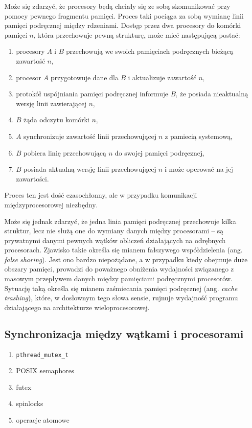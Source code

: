 \documentclass[12pt,a4paper,titlepage,twoside]{mwart}
\begin{document}
Może się zdarzyć, że procesory będą chciały się ze sobą skomunikować przy
pomocy pewnego fragmentu pamięci. Proces taki pociąga za sobą wymianę linii
pamięci podręcznej między rdzeniami. Dostęp przez dwa procesory do komórki
pamięci $n$, która przechowuje pewną strukturę, może mieć następującą postać:

\begin{enumerate}
\item procesory $A$ i $B$ przechowują we swoich pamięciach podręcznych
bieżącą zawartość $n$,
\item procesor $A$ przygotowuje dane dla $B$ i aktualizuje zawartość $n$,
\item protokół uspójniania pamięci podręcznej informuje $B$, że posiada
nieaktualną wersję linii zawierającej $n$,
\item $B$ żąda odczytu komórki $n$,
\item $A$ synchronizuje zawartość linii przechowującej $n$ z pamiecią
systemową,
\item $B$ pobiera linię przechowującą $n$ do swojej pamięci podręcznej,
\item $B$ posiada aktualną wersję linii przechowującej $n$ i może operować na
jej zawartości.
\end{enumerate}

Proces ten jest dość czasochłonny, ale w przypadku komunikacji
międzyprocesorowej niezbędny.

Może się jednak zdarzyć, że jedna linia pamięci podręcznej przechowuje kilka
struktur, lecz nie służą one do wymiany danych między procesorami -- są
prywatnymi danymi pewnych wątków obliczeń działających na odrębnych procesorach.
Zjawisko takie określa się mianem fałszywego współdzielenia (ang. \textit{false
sharing}). Jest ono bardzo niepożądane, a w przypadku kiedy obejmuje duże
obszary pamięci, prowadzi do poważnego obniżenia wydajności związanego z
masowym przepływem danych między pamięciami podręcznymi procesorów. Sytuację
taką określa się mianem zaśmiecania pamięci podręcznej (ang. \textit{cache
trashing}), które, w dosłownym tego słowa sensie, rujnuje wydajność programu
działającego na architekturze wieloprocesorowej.

\subsection{Synchronizacja między wątkami i procesorami}

\begin{enumerate}
\item \verb+pthread_mutex_t+
\item POSIX semaphores
\item futex
\item spinlocks
\item operacje atomowe
\end{enumerate}
\end{document}
